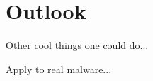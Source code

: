 \section{Outlook}\label{sec:outlook}

Other cool things one could do...

Apply to real malware...




\iffalse
§7	Outlook
		> Was man sonst noch Tolles machen könnte.
		> Anwendung auf echte Malware, etc…
\fi